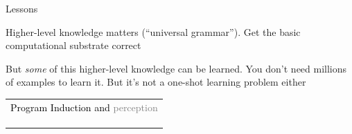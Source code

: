 \documentclass{beamer}
\begin{document}

\begin{frame}{Lessons}

  Higher-level knowledge matters (``universal grammar''). Get the basic computational substrate correct

  \vspace{1cm}

  But \emph{some} of this higher-level knowledge can be learned. You don't need millions of examples to learn it. But it's not a one-shot learning problem either

\end{frame}

\begin{frame}{}
  \begin{center}
    \begin{tabular}{l}
      {\textcolor{black}{Program Induction and }\textcolor{gray}{perception}}\\
      \phantom{Program Induction and }{\textcolor{gray}{learning to learn}}\\
      \phantom{Program Induction and }{\textcolor{gray}{model discovery}}\\
      \phantom{Program Induction and }{\textcolor{black}{the future}}
      \end{tabular}
  \end{center}
\end{frame}
\end{document}
